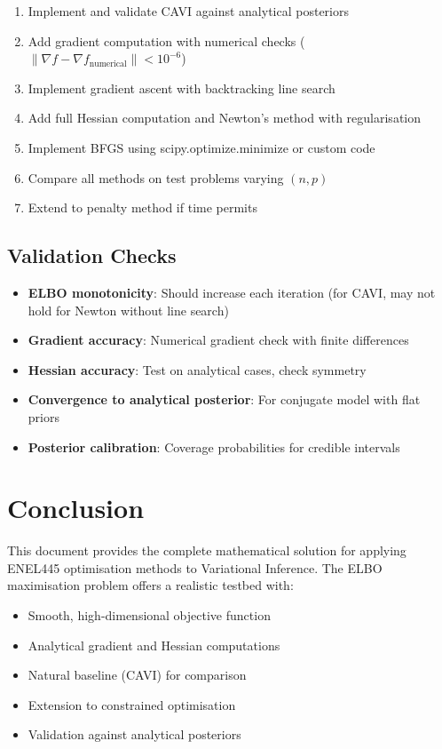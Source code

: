 \documentclass[11pt]{article}
\begin{document}
\begin{enumerate}
\item Implement and validate CAVI against analytical posteriors
\item Add gradient computation with numerical checks ($\|\nabla f - \nabla f_{\text{numerical}}\| < 10^{-6}$)
\item Implement gradient ascent with backtracking line search
\item Add full Hessian computation and Newton's method with regularisation
\item Implement BFGS using scipy.optimize.minimize or custom code
\item Compare all methods on test problems varying $(n, p)$
\item Extend to penalty method if time permits
\end{enumerate}

\subsection{Validation Checks}

\begin{itemize}
\item \textbf{ELBO monotonicity}: Should increase each iteration (for CAVI, may not hold for Newton without line search)
\item \textbf{Gradient accuracy}: Numerical gradient check with finite differences
\item \textbf{Hessian accuracy}: Test on analytical cases, check symmetry
\item \textbf{Convergence to analytical posterior}: For conjugate model with flat priors
\item \textbf{Posterior calibration}: Coverage probabilities for credible intervals
\end{itemize}

\section{Conclusion}

This document provides the complete mathematical solution for applying ENEL445 optimisation methods to Variational Inference. The ELBO maximisation problem offers a realistic testbed with:
\begin{itemize}
\item Smooth, high-dimensional objective function
\item Analytical gradient and Hessian computations
\item Natural baseline (CAVI) for comparison
\item Extension to constrained optimisation
\item Validation against analytical posteriors
\end{itemize}
\end{document}
